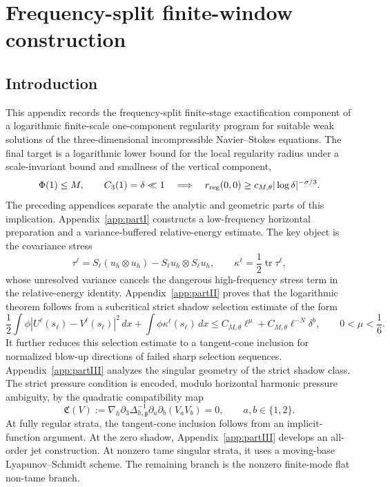 \documentclass[11pt]{article}
\numberwithin{equation}{section}
\theoremstyle{plain}
\theoremstyle{definition}
\theoremstyle{remark}
\newcommand{\tr}{\operatorname{tr}}
\newcommand{\dx}{\,dx}
\newcommand{\nabh}{\nabla_h}
\newcommand{\calC}{\mathfrak C}
\begin{document}
\section{Frequency-split finite-window construction}\label{app:partIV}

\subsection{Introduction}

This appendix records the frequency-split finite-stage exactification component of a logarithmic finite-scale one-component
regularity program for suitable weak solutions of the three-dimensional
incompressible Navier--Stokes equations.  The final target is a logarithmic lower
bound for the local regularity radius under a scale-invariant bound and smallness
of the vertical component,
\begin{equation}\label{pIV:eq:target-intro}
        \Phi(1)\le M,
        \qquad
        C_3(1)=\delta\ll1
        \quad\Longrightarrow\quad
        r_{\rm reg}(0,0)
        \ge c_{M,\theta}|\log\delta|^{-\sigma/3}.
\end{equation}
The preceding appendices separate the analytic and geometric parts of this implication.
Appendix~\ref{app:partI} constructs a low-frequency horizontal preparation and a variance-buffered
relative-energy estimate.  The key object is the covariance stress
\[
        \tau^\ell=S_\ell(u_h\otimes u_h)-S_\ell u_h\otimes S_\ell u_h,
        \qquad
        \kappa^\ell=\frac12\tr\tau^\ell,
\]
whose unresolved variance cancels the dangerous high-frequency stress term in the
relative-energy identity.  Appendix~\ref{app:partII} proves that the logarithmic theorem follows
from a subcritical strict shadow selection estimate of the form
\begin{equation}\label{pIV:eq:selection-intro}
        \frac12\int \phi |U^\ell(s_\ell)-V^\ell(s_\ell)|^2\dx
        +\int \phi\kappa^\ell(s_\ell)\dx
        \le C_{M,\theta}\ell^\mu+C_{M,\theta}\ell^{-N}\delta^b,
        \qquad 0<\mu<\frac16 .
\end{equation}
It further reduces this selection estimate to a tangent-cone inclusion for
normalized blow-up directions of failed sharp selection sequences.  Appendix~\ref{app:partIII}
analyzes the singular geometry of the strict shadow class.  The strict pressure
condition is encoded, modulo horizontal harmonic pressure ambiguity, by the
quadratic compatibility map
\begin{equation}\label{pIV:eq:C-intro}
        \calC(V)
        :=\nabh\partial_3\Delta_{h,\mathfrak g}^{-1}\partial_a\partial_b(V_aV_b)=0,
        \qquad a,b\in\{1,2\}.
\end{equation}
At fully regular strata, the tangent-cone inclusion follows from an implicit-function
argument.  At the zero shadow, Appendix~\ref{app:partIII} develops an all-order jet construction.  At
nonzero tame singular strata, it uses a moving-base Lyapunov--Schmidt scheme.  The
remaining branch is the nonzero finite-mode flat non-tame branch.
\end{document}
